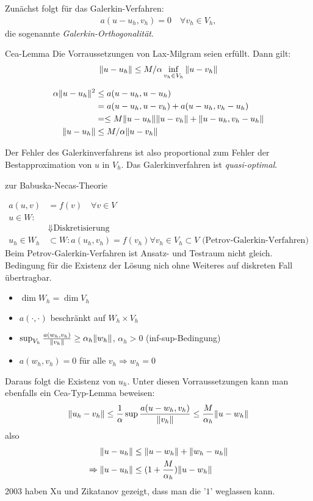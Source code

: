 Zunächst folgt für das Galerkin-Verfahren:
\begin{align*}
  a(u-u_h, v_h)= 0 \quad \forall v_h \in V_h,  
\end{align*}
die sogenannte \emph{Galerkin-Orthogonalität}.
\begin{lemma} Cea-Lemma
  Die Vorraussetzungen von Lax-Milgram seien erfüllt. Dann gilt:
  \begin{align*}
    \|u-u_h\| \leq M/\alpha \inf_{v_h \in V_h} \|u- v_h\|
  \end{align*}
\end{lemma}
  \begin{beweis}
\begin{align*}
  \alpha\|u-u_h\|^2 &\leq a(u- u_h, u-u_h) \\
&= a(u-u_h, u-v_h) + a(u-u_h, v_h - u_h)\\
&= \leq M \|u-u_h\|\|u-v_h\| + \|u-u_h, v_h - u_h\|\\
\|u-u_h\| &\leq M/\alpha \|u-v_h\|
\end{align*}
\end{beweis}
Der Fehler des Galerkinverfahrens ist also proportional zum Fehler der Bestapproximation von $u$ in $V_h$. Das Galerkinverfahren ist \emph{quasi-optimal}.
\begin{bemerkung} zur Babuska-Necas-Theorie

  \begin{align*}
    a(u, v)& = f(v) \quad \forall v \in V\\
u \in W:& \\
&\Downarrow \text{Diskretisierung}\\
u_h \in W_h &\subset W: a(u_h, v_h) = f(v_h) \forall v_h \in V_h \subset V \text{ (Petrov-Galerkin-Verfahren)}
  \end{align*}
  Beim Petrov-Galerkin-Verfahren ist Ansatz- und Testraum nicht gleich. Bedingung für die Existenz der Lösung nich ohne Weiteres auf diskreten Fall übertragbar. 
  \begin{itemize}
  \item $\dim W_h = \dim V_h$\\
  \item $a(\cdot , \cdot)$ beschränkt auf $W_h \times V_h$
  \item $\sup_{V_h}\frac{a(w_h, v_h)}{\|v_h\|}\geq \alpha_h \|w_h\|$, $\alpha_h > 0 $ (inf-sup-Bedingung)
\item $a(w_h, v_h) = 0$ für alle $v_h \Rightarrow w_h = 0$
  \end{itemize}
Daraus folgt die Existenz von $u_h$.
Unter diesen Vorraussetzungen kann man ebenfalls ein Cea-Typ-Lemma beweisen: 
\begin{align*}
  \|u_h - v_h\| \leq \frac 1 \alpha \sup \frac{a(u- w_h, v_h)}{\|v_h\|} \leq \frac M {\alpha_h} \|u-w_h\|
\end{align*}
also
\begin{align*}
  \|u-u_h\| &\leq \|u-w_h\|+ \|w_h-u_h\|\\
\Rightarrow \|u-u_h\| &\leq (1 + \frac{M}{\alpha_h})\|u-w_h\|
\end{align*}
2003 haben Xu und Zikatanov gezeigt, dass man die '$1$' weglassen kann.
\end{bemerkung}
